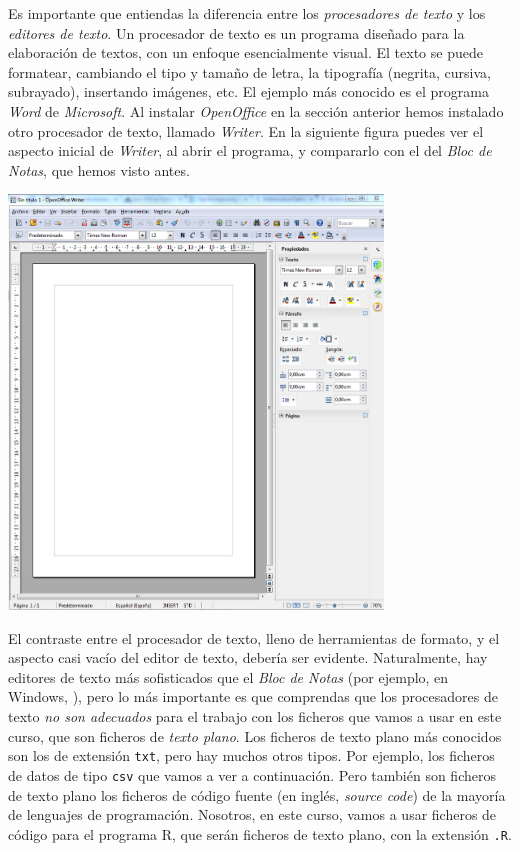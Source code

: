 \documentclass[10pt,a4paper]{article}\usepackage[]{graphicx}\usepackage[]{color}
\newcounter {cont01}
\begin{document}
Es importante que entiendas la diferencia entre los {\em procesadores de texto} y los {\em editores
de texto}. Un procesador de texto es un programa diseñado para la elaboración de textos, con un
enfoque esencialmente visual. El texto se puede formatear, cambiando el tipo y tamaño de letra,  la
tipografía (negrita, cursiva, subrayado), insertando imágenes, etc.  El ejemplo más conocido es el
programa {\em Word} de {\em Microsoft}. Al instalar {\em OpenOffice} en la sección anterior hemos
instalado otro procesador de texto, llamado {\em Writer}. En la siguiente figura puedes ver el
aspecto inicial de {\em Writer}, al abrir el programa, y compararlo con el del {\em Bloc de Notas},
que hemos visto antes.
    \begin{center}
    \includegraphics[height=11cm]{../fig/Tut00-ProcesadorVsEditor.png}
    \end{center}
El contraste entre el procesador de texto, lleno de herramientas de formato, y el aspecto casi
vacío del editor de texto, debería ser evidente. Naturalmente, hay editores de texto más
sofisticados que el {\em Bloc de Notas} (por ejemplo, en Windows,
), pero lo más importante es que comprendas que los
procesadores de texto {\em no son adecuados} para el trabajo con los ficheros que vamos a usar en
este curso, que son ficheros de {\em texto plano}. Los ficheros de texto plano más conocidos son
los de extensión {\tt txt}, pero hay muchos otros tipos. Por ejemplo, los ficheros de datos de tipo
{\tt csv} que vamos a ver a continuación. Pero también son ficheros de texto plano los ficheros de
{\sf código fuente} (en inglés, {\em source code}) de la mayoría de lenguajes de programación.
Nosotros, en este curso, vamos a usar ficheros de código para el programa R, que serán ficheros de
texto plano, con la extensión {\tt .R}.
\end{document}
